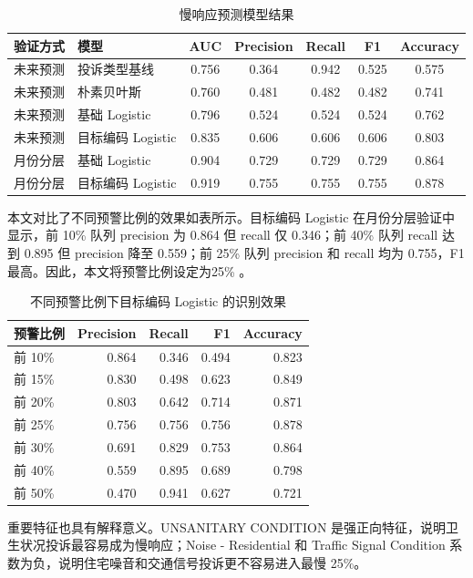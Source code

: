\documentclass[UTF8,a4paper,12pt]{ctexart}
\begin{document}
\begin{table}[H]
\centering
\scriptsize
\caption{慢响应预测模型结果}
\label{tab:model_results}
\begin{tabular}{llccccc}
\toprule
验证方式 & 模型 & AUC & Precision & Recall & F1 & Accuracy\\
\midrule
未来预测 & 投诉类型基线 & 0.756 & 0.364 & 0.942 & 0.525 & 0.575\\
未来预测 & 朴素贝叶斯 & 0.760 & 0.481 & 0.482 & 0.482 & 0.741\\
未来预测 & 基础 Logistic & 0.796 & 0.524 & 0.524 & 0.524 & 0.762\\
未来预测 & 目标编码 Logistic & 0.835 & 0.606 & 0.606 & 0.606 & 0.803\\
月份分层 & 基础 Logistic & 0.904 & 0.729 & 0.729 & 0.729 & 0.864\\
月份分层 & 目标编码 Logistic & 0.919 & 0.755 & 0.755 & 0.755 & 0.878\\

\bottomrule
\end{tabular}
\end{table}

本文对比了不同预警比例的效果如表所示。目标编码 Logistic 在月份分层验证中显示，前 10\% 队列 precision 为 0.864 但 recall 仅 0.346；前 40\% 队列 recall 达到 0.895 但 precision 降至 0.559；前 25\% 队列 precision 和 recall 均为 0.755，F1 最高。因此，本文将预警比例设定为25\% 。


\begin{table}[H]
\centering
\scriptsize
\caption{不同预警比例下目标编码 Logistic 的识别效果}
\label{tab:alert_share}
\begin{tabular}{lrrrr}
\toprule
预警比例 & Precision & Recall & F1 & Accuracy\\
\midrule
前 10\% & 0.864 & 0.346 & 0.494 & 0.823\\
前 15\% & 0.830 & 0.498 & 0.623 & 0.849\\
前 20\% & 0.803 & 0.642 & 0.714 & 0.871\\
前 25\% & 0.756 & 0.756 & 0.756 & 0.878\\
前 30\% & 0.691 & 0.829 & 0.753 & 0.864\\
前 40\% & 0.559 & 0.895 & 0.689 & 0.798\\
前 50\% & 0.470 & 0.941 & 0.627 & 0.721\\
\bottomrule
\end{tabular}
\end{table}

重要特征也具有解释意义。UNSANITARY CONDITION 是强正向特征，说明卫生状况投诉最容易成为慢响应；Noise - Residential 和 Traffic Signal Condition 系数为负，说明住宅噪音和交通信号投诉更不容易进入最慢 25\%。
\end{document}

